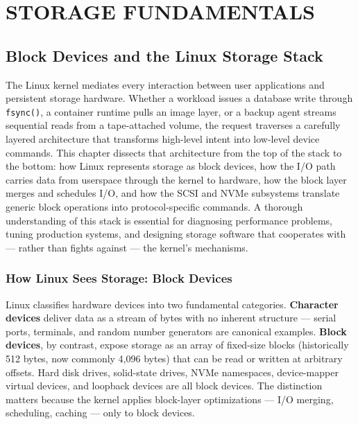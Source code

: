\part{STORAGE FUNDAMENTALS}

\chapter{Block Devices and the Linux Storage Stack}
\label{ch:1}

The Linux kernel mediates every interaction between user applications and persistent storage hardware. Whether a workload issues a database write through \texttt{fsync()}, a container runtime pulls an image layer, or a backup agent streams sequential reads from a tape-attached volume, the request traverses a carefully layered architecture that transforms high-level intent into low-level device commands. This chapter dissects that architecture from the top of the stack to the bottom: how Linux represents storage as block devices, how the I/O path carries data from userspace through the kernel to hardware, how the block layer merges and schedules I/O, and how the SCSI and NVMe subsystems translate generic block operations into protocol-specific commands. A thorough understanding of this stack is essential for diagnosing performance problems, tuning production systems, and designing storage software that cooperates with --- rather than fights against --- the kernel's mechanisms.

\section{How Linux Sees Storage: Block Devices}
\label{sec:block-devices}

Linux classifies hardware devices into two fundamental categories. \textbf{Character devices} deliver data as a stream of bytes with no inherent structure --- serial ports, terminals, and random number generators are canonical examples. \textbf{Block devices}, by contrast, expose storage as an array of fixed-size blocks (historically 512 bytes, now commonly 4,096 bytes) that can be read or written at arbitrary offsets. Hard disk drives, solid-state drives, NVMe namespaces, device-mapper virtual devices, and loopback devices are all block devices. The distinction matters because the kernel applies block-layer optimizations --- I/O merging, scheduling, caching --- only to block devices.

